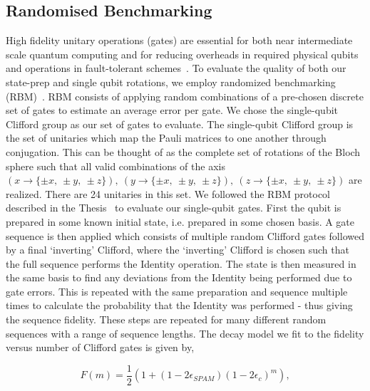 \documentclass[12pt]{report}
\begin{document}
\subsection{Randomised Benchmarking}
\label{sec:Randomised Benchmarking}
    High fidelity unitary operations (gates) are essential for both near
    intermediate scale quantum computing and for reducing overheads in required
    physical qubits and operations in fault-tolerant
    schemes~\cite{steane_overhead_2003}. To evaluate the quality of both our
    state-prep and single qubit rotations, we employ randomized benchmarking
    (RBM)~\cite{knill_randomized_2008, magesan_scalable_2011}.  RBM consists of
    applying random combinations of a pre-chosen discrete set of gates to
    estimate an average error per gate.  We chose the single-qubit Clifford
    group as our set of gates to evaluate. The single-qubit Clifford group is
    the set of unitaries which map the Pauli matrices to one another through
    conjugation. This can be thought of as the complete set of rotations of the
    Bloch sphere such that all valid combinations of the axis $(x \rightarrow
    \{\pm x,~\pm y,~\pm z\}),~(y \rightarrow \{\pm x,~\pm y,~\pm z\}),~(z
    \rightarrow \{\pm x,~\pm y,~\pm z\})$ are realized. There are 24 unitaries
    in this set. We followed the RBM protocol described in the
    Thesis~\cite{hughes_benchmarking_2021} to evaluate our single-qubit gates.
    First the qubit is prepared in some known initial state, i.e. prepared in
    some chosen basis. A gate sequence is then applied which consists of
    multiple random Clifford gates followed by a final `inverting' Clifford,
    where the `inverting' Clifford is chosen such that the full sequence
    performs the Identity operation. The state is then measured in the same
    basis to find any deviations from the Identity being performed due to gate
    errors. This is repeated with the same preparation and sequence multiple
    times to calculate the probability that the Identity was performed - thus
    giving the sequence fidelity. These steps are repeated for many different
    random sequences with a range of sequence lengths. The decay model we fit to
    the fidelity versus number of Clifford gates is given by,

    \begin{equation}
        F(m) = \frac{1}{2}\left( 1+(1-2\epsilon_{SPAM})(1-2\epsilon_c)^m\right),
    \end{equation}
\end{document}
